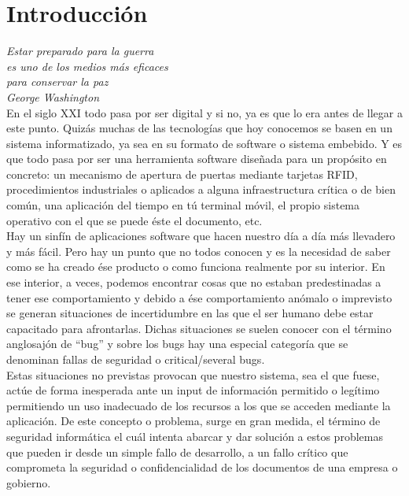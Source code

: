 \chapter{Introducción}
\label{chap:introducción}

\emph{Estar preparado para la guerra\\ es uno de los medios más eficaces\\ para conservar la paz\\ George Washington}\\

En el siglo XXI todo pasa por ser digital y si no, ya es que lo era antes de llegar a este punto. Quizás muchas de las tecnologías que hoy conocemos se basen en un sistema informatizado, ya sea en su formato de software o sistema embebido. Y es que todo pasa por ser una herramienta software diseñada para un propósito en concreto: un mecanismo de apertura de puertas mediante tarjetas RFID, procedimientos industriales o aplicados a alguna infraestructura crítica o de bien común, una aplicación del tiempo en tú terminal móvil, el propio sistema operativo con el que se puede éste el documento, etc. \\

Hay un sinfín de aplicaciones software que hacen nuestro día a día más llevadero y más fácil. Pero hay un punto que no todos conocen y es la necesidad de saber como se ha creado ése producto o como funciona realmente por su interior. En ese interior, a veces, podemos encontrar cosas que no estaban predestinadas a tener ese comportamiento y debido a ése comportamiento anómalo o imprevisto se generan situaciones de incertidumbre en las que el ser humano debe estar capacitado para afrontarlas. Dichas situaciones se suelen conocer con el término anglosajón de ``bug'' y sobre los bugs hay una especial categoría que se denominan fallas de seguridad o critical/several bugs. \\

Estas situaciones no previstas provocan que nuestro sistema, sea el que fuese, actúe de forma inesperada ante un input de información permitido o legítimo permitiendo un uso inadecuado de los recursos a los que se acceden mediante la aplicación. De este concepto o problema, surge en gran medida, el término de seguridad informática el cuál intenta abarcar y dar solución a estos problemas que pueden ir desde un simple fallo de desarrollo, a un fallo crítico que comprometa la seguridad o confidencialidad de los documentos de una empresa o gobierno. \\

